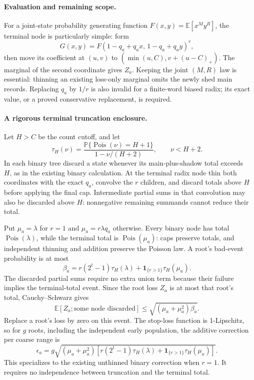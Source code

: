 \documentclass[11pt]{article}
\theoremstyle{definition}
\theoremstyle{remark}
\newcommand{\E}{\mathbb E}
\newcommand{\Prb}{\mathbb P}
\newcommand{\Pois}{\operatorname{Pois}}
\newcommand{\ind}{\mathbf 1}
\begin{document}
\paragraph{Evaluation and remaining scope.}
For a joint-state probability generating function
$F(x,y)=\mathbb E[x^M y^R]$, the terminal node is particularly simple:
form
\[
 G(x,y)=F(1-q_a+q_a x,\,1-q_a+q_a y)^r,
\]
then move its coefficient at $(u,v)$ to
$(\min(u,C),v+(u-C)_+)$. The marginal of the second coordinate gives
$Z_a$. Keeping the joint $(M,R)$ law is essential: thinning an existing
loss-only marginal omits the newly shed main records. Replacing $q_a$ by
$1/r$ is also invalid for a finite-word biased radix; its exact value, or a
proved conservative replacement, is required.

\paragraph{A rigorous terminal truncation enclosure.}
Let $H>C$ be the count cutoff, and let
\[
 \tau_H(\nu)=\frac{\Prb\{\Pois(\nu)=H+1\}}{1-\nu/(H+2)},
 \qquad \nu<H+2.
\]
In each binary tree discard a state whenever its main-plus-shadow total
exceeds $H$, as in the existing binary calculation. At the terminal radix
node thin both coordinates with the exact $q_a$, convolve the $r$ children,
and discard totals above $H$ before applying the final cap. Intermediate
partial sums in that convolution may also be discarded above $H$:
nonnegative remaining summands cannot reduce their total.

Put $\mu_a=\lambda$ for $r=1$ and $\mu_a=r\lambda q_a$ otherwise. Every
binary node has total $\Pois(\lambda)$, while the terminal total is
$\Pois(\mu_a)$: caps preserve totals, and independent thinning and addition
preserve the Poisson law. A root's bad-event probability is at most
\[
 \beta_a=r(2^t-1)\tau_H(\lambda)
              +\ind_{\{r>1\}}\tau_H(\mu_a).
\]
The discarded partial sums require no extra union term because their
failure implies the terminal-total event. Since the root loss $Z_a$ is
at most that root's total, Cauchy--Schwarz gives
\[
 \E[Z_a;\text{some node discarded}]
       \le\sqrt{(\mu_a+\mu_a^2)\beta_a}.
\]
Replace a root's loss by zero on this event. The stop-loss function is
1-Lipschitz, so for $g$ roots, including the independent early population,
the additive correction per coarse range is
\[
 \boxed{\epsilon_a=g\sqrt{(\mu_a+\mu_a^2)
       \left[r(2^t-1)\tau_H(\lambda)
                 +\ind_{\{r>1\}}\tau_H(\mu_a)\right]}.}
\]
This specializes to the existing unthinned binary correction when $r=1$.
It requires no independence between truncation and the terminal total.
\end{document}
